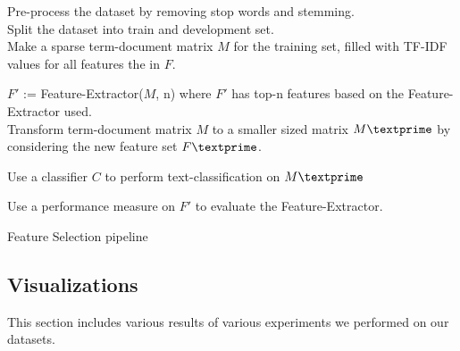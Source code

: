 \documentclass[a4paper, 14pt]{article}
\begin{document}
\begin{justify}
\begin{justify}
\begin{algorithm}

    
    Pre-process the dataset by removing stop words and stemming. \\
    
    Split the dataset into train and development set.\\

    Make a sparse term-document matrix $M$ for the training set, filled with TF-IDF values for all features the in $F$.\\
    
    
    $F'$ := Feature-Extractor($M$, n) where $F'$ has top-n features based on the Feature-Extractor used. \\
    
    Transform term-document matrix $M$ to a smaller sized matrix $M \textprime$ by considering the new feature set $F \textprime$.
    
    Use a classifier $C$ to perform text-classification on $M \textprime$
    
    Use a performance measure on $F'$ to evaluate the Feature-Extractor.

    \caption{Feature Selection pipeline}
    \label{algo:algo1}
\end{algorithm}


\end{justify}

\newpage
\subsection{Visualizations}
\begin{justify}

This section includes various results of various experiments we performed on our datasets.



\end{justify}
\end{justify}
\end{document}

